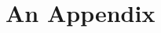 \documentclass[a4paper, 11pt, oneside]{thesis/HSR}  %
\begin{document}

\appendix %




\chapter{An Appendix}
\Blindtext

\backmatter

\label{Bibliography}
\end{document}
